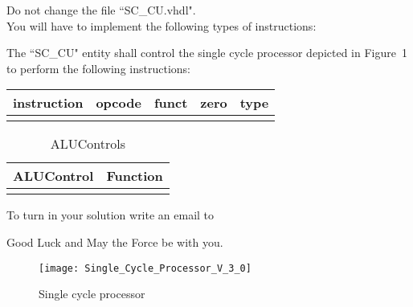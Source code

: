 \documentclass[a4paper,12pt]{article}
\newcommand\Tstrut{\rule{0pt}{2.6ex}}       %
\begin{document}
Do not change the file ``SC\_CU.vhdl".\\


You will have to implement the following types of instructions:

The ``SC\_CU" entity shall control the single cycle processor depicted in Figure~1 to perform the following instructions:

\begin{table}[h!]
\centering
    \begin{tabular}{|c|c|c|c|c|} \hline \Tstrut
		instruction & opcode  & funct	& zero & type   \\ \hline \Tstrut
    \hline
    \end{tabular}
\end{table}


\begin{table}[h!]
\centering
    \begin{tabular}{|c|c|} \hline \Tstrut
		ALUControl & Function   \\ \hline \Tstrut
    \hline
    \end{tabular}
    \caption{ALUControls}
    \label{tab:ALUControls}  
\end{table}

To turn in your solution write an email to %

\vspace{0.7cm}
Good Luck and May the Force be with you.

\begin{landscape}
\begin{figure}[!h]
\vspace{-0.5cm}
\hspace{-1.8cm}
\texttt{[image: Single\_Cycle\_Processor\_V\_3\_0]}
\caption{Single cycle processor}
\label{fig:SingleCycleProcessor}
\end{figure}
\end{landscape}
\end{document}
